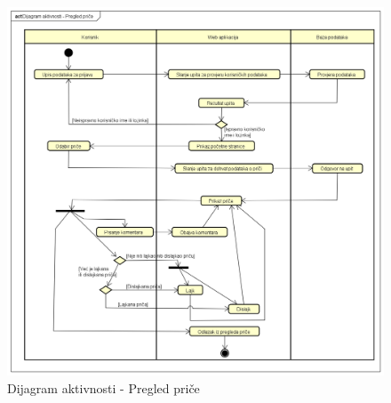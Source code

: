 		
		\begin{figure}[!h]
			\centering
			\includegraphics[width=1\linewidth]{slike/dijagram_aktivnosti}
			\caption{Dijagram aktivnosti - Pregled priče}
			\label{fig:dijagramaktivnosti}
		\end{figure}
	\eject